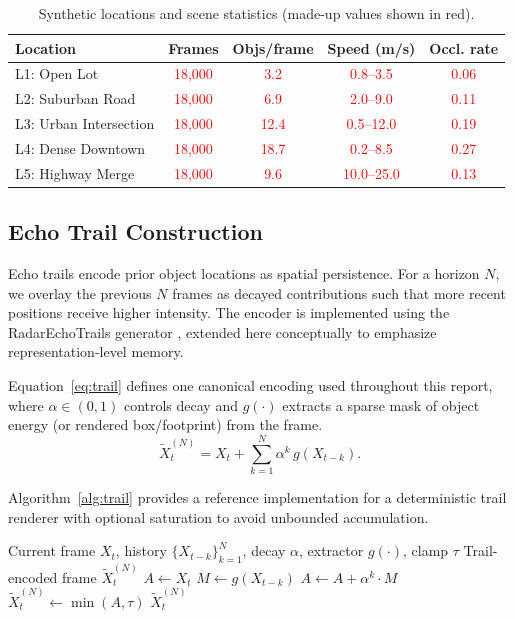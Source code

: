 \documentclass[twocolumn, 10pt]{article}
\newcommand{\ph}[1]{\textcolor{red}{#1}}
\begin{document}
\begin{table}[t]
\centering
\caption{Synthetic locations and scene statistics (made-up values shown in red).}
\label{tab:locations}
\begin{tabular}{@{}lcccc@{}}
\toprule
\textbf{Location} & \textbf{Frames} & \textbf{Objs/frame} & \textbf{Speed (m/s)} & \textbf{Occl. rate} \\
\midrule
L1: Open Lot & \ph{18{,}000} & \ph{3.2} & \ph{0.8--3.5} & \ph{0.06} \\
L2: Suburban Road & \ph{18{,}000} & \ph{6.9} & \ph{2.0--9.0} & \ph{0.11} \\
L3: Urban Intersection & \ph{18{,}000} & \ph{12.4} & \ph{0.5--12.0} & \ph{0.19} \\
L4: Dense Downtown & \ph{18{,}000} & \ph{18.7} & \ph{0.2--8.5} & \ph{0.27} \\
L5: Highway Merge & \ph{18{,}000} & \ph{9.6} & \ph{10.0--25.0} & \ph{0.13} \\
\bottomrule
\end{tabular}
\end{table}

\subsection{Echo Trail Construction}
Echo trails encode prior object locations as spatial persistence. For a horizon $N$, we overlay the previous $N$ frames as decayed contributions such that more recent positions receive higher intensity. The encoder is implemented using the RadarEchoTrails generator \cite{RadarEchoTrails}, extended here conceptually to emphasize representation-level memory.

Equation~\eqref{eq:trail} defines one canonical encoding used throughout this report, where $\alpha\in(0,1)$ controls decay and $g(\cdot)$ extracts a sparse mask of object energy (or rendered box/footprint) from the frame.
\begin{equation}
\tilde{X}_t^{(N)} = X_t + \sum_{k=1}^{N} \alpha^{k}\, g(X_{t-k}).
\label{eq:trail}
\end{equation}

Algorithm~\ref{alg:trail} provides a reference implementation for a deterministic trail renderer with optional saturation to avoid unbounded accumulation.

\begin{algorithm}[t]
\caption{Echo trail rendering for horizon $N$}
\label{alg:trail}
\begin{algorithmic}[1]
\Require Current frame $X_t$, history $\{X_{t-k}\}_{k=1}^N$, decay $\alpha$, extractor $g(\cdot)$, clamp $\tau$
\Ensure Trail-encoded frame $\tilde{X}_t^{(N)}$
\State $A \gets X_t$
  \State $M \gets g(X_{t-k})$
  \State $A \gets A + \alpha^{k} \cdot M$
\EndFor
\State $\tilde{X}_t^{(N)} \gets \min(A,\tau)$ 
\State \Return $\tilde{X}_t^{(N)}$
\end{algorithmic}
\end{algorithm}
\end{document}
